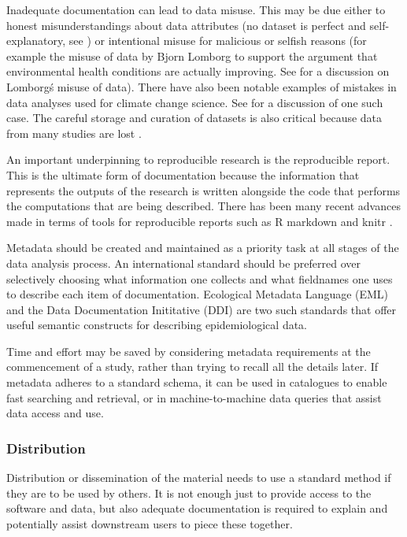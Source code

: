 \documentclass[11pt,a4paper]{article}
\begin{document}
Inadequate documentation can lead to data misuse.  This may be due either to honest misunderstandings
about data attributes (no dataset is perfect and self-explanatory, see
\citet{Michener1997}) or intentional misuse for malicious or selfish
reasons (for example the misuse of data by Bjorn Lomborg to support the
argument that environmental health conditions are actually improving.
See \citet{Bodnar2004} for a discussion on Lomborg\'s misuse
of data).  There have also been notable examples of mistakes in data
analyses used for climate change science.  See
\citet{Cai2010} for a discussion of one such case.  The
careful storage and curation of datasets is also critical because data from many
studies are lost \citep{Pullin2010,Vines2014a}.

An important underpinning to reproducible research is the reproducible
report. This is the ultimate form of documentation because the
information that represents the outputs of the research is written
alongside the code that performs the computations that are being
described. There has been many recent advances made in terms of tools
for reproducible reports such as R markdown and knitr \citep{Xie2014a}.

Metadata should be created and maintained as a priority task at all
stages of the data analysis process. An international standard should be
preferred over selectively choosing what information one collects and
what fieldnames one uses to describe each item of documentation.
Ecological Metadata Language (EML) and the Data Documentation
Inititative (DDI) are two such standards that offer useful semantic
constructs for describing epidemiological data.

Time and effort may be
saved by considering metadata requirements at the commencement of a
study, rather than trying to recall all the details later. If metadata
adheres to a standard schema, it can be used in catalogues to enable
fast searching and retrieval, or in machine-to-machine data queries that
assist data access and use.


\subsubsection{Distribution}\label{distribution}

Distribution or dissemination of the material needs to use a standard
method if they are to be used by others. It is not enough just to
provide access to the software and data, but also adequate documentation
is required to explain and potentially assist downstream users to piece
these together.
\end{document}
